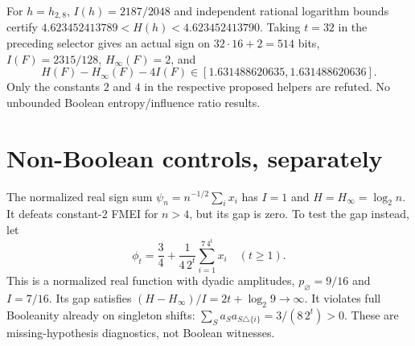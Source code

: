 \documentclass{article}
\begin{document}
For $h=h_{2,8}$, $I(h)=2187/2048$ and independent rational
logarithm bounds certify
$4.623452413789<H(h)<4.623452413790$.
Taking $t=32$ in the preceding selector gives an actual sign on
$32\cdot16+2=514$ bits, $I(F)=2315/128$, $H_\infty(F)=2$, and
\[
 H(F)-H_\infty(F)-4I(F)
 \in[1.631488620635,1.631488620636].
\]
Only the constants $2$ and $4$ in the respective proposed helpers
are refuted. No unbounded Boolean entropy/influence ratio results.

\section*{Non-Boolean controls, separately}
The normalized real sign sum $\psi_n=n^{-1/2}\sum_i x_i$ has
$I=1$ and $H=H_\infty=\log_2n$. It defeats constant-2 FMEI for
$n>4$, but its gap is zero. To test the gap instead, let
\[
 \phi_t=\frac34+\frac1{4\,2^t}\sum_{i=1}^{7\,4^t}x_i\quad(t\ge1).
\]
This is a normalized real function with dyadic amplitudes,
$p_\varnothing=9/16$ and $I=7/16$.
Its gap satisfies $(H-H_\infty)/I=2t+\log_2 9\to\infty$.
It violates full Booleanity already on singleton shifts:
$\sum_Sa_Sa_{S\triangle\{i\}}=3/(8\,2^t)>0$.
These are missing-hypothesis diagnostics, not Boolean witnesses.
\end{document}
